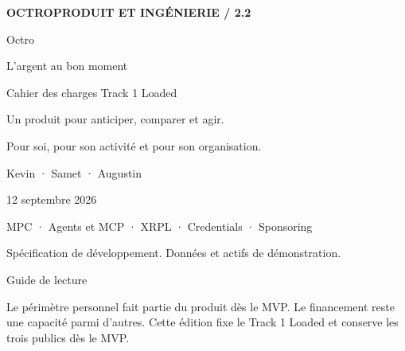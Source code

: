 \documentclass[10pt,a4paper]{article}
\begin{document}
\color{ink}\fontsize{10.5}{14.2}\selectfont
\begin{titlepage}
\pagecolor{cream}\thispagestyle{empty}
{\fontsize{9}{12}\selectfont\bfseries OCTRO\hfill PRODUIT ET INGÉNIERIE / 2.2\par}
\vspace*{24mm}
{\displayfont\fontsize{65}{70}\selectfont\color{forest}Octro\par}
\vspace{6mm}
{\displayfont\fontsize{28}{34}\selectfont L’argent au bon moment\par}
\vspace{8mm}
{\fontsize{14}{20}\selectfont Cahier des charges Track 1 Loaded\par}
\vspace{7mm}
\parbox{.88\linewidth}{\fontsize{12}{18}\selectfont Un produit pour anticiper, comparer et agir.\par Pour soi, pour son activité et pour son organisation.}\par
\vspace{14mm}
\noindent\colorbox{forest}{\parbox{\dimexpr\linewidth-24pt\relax}{\vspace{13pt}\par\vspace{10pt}\par\vspace{14pt}}}\par
\vfill
{\fontsize{10}{14}\selectfont Kevin · Samet · Augustin\par 12 septembre 2026\par}
\vspace{5mm}
{\fontsize{8}{11}\selectfont MPC · Agents et MCP · XRPL · Credentials · Sponsoring\par Spécification de développement. Données et actifs de démonstration.}
\end{titlepage}
\nopagecolor\pagestyle{octro}\setcounter{page}{2}
{\displayfont\fontsize{28}{34}\selectfont\color{forest}Guide de lecture\par}
\vspace{4mm}
Le périmètre personnel fait partie du produit dès le MVP. Le financement reste une capacité parmi d’autres. Cette édition fixe le Track 1 Loaded et conserve les trois publics dès le MVP.
\vspace{3mm}
\end{document}

